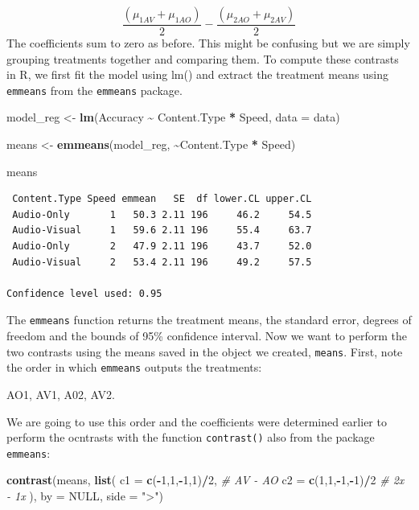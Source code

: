 \documentclass[
  letterpaper,
]{book}
\newenvironment{Shaded}{\begin{snugshade}}{\end{snugshade}}
\newcommand{\AttributeTok}[1]{\textcolor[rgb]{0.13,0.29,0.53}{#1}}
\newcommand{\CommentTok}[1]{\textcolor[rgb]{0.56,0.35,0.01}{\textit{#1}}}
\newcommand{\ConstantTok}[1]{\textcolor[rgb]{0.56,0.35,0.01}{#1}}
\newcommand{\DecValTok}[1]{\textcolor[rgb]{0.00,0.00,0.81}{#1}}
\newcommand{\FunctionTok}[1]{\textcolor[rgb]{0.13,0.29,0.53}{\textbf{#1}}}
\newcommand{\NormalTok}[1]{#1}
\newcommand{\OtherTok}[1]{\textcolor[rgb]{0.56,0.35,0.01}{#1}}
\newcommand{\SpecialCharTok}[1]{\textcolor[rgb]{0.81,0.36,0.00}{\textbf{#1}}}
\newcommand{\StringTok}[1]{\textcolor[rgb]{0.31,0.60,0.02}{#1}}
\begin{document}
\[\frac{(\mu_{1AV} + \mu_{1AO})}{2} - \frac{(\mu_{2AO} + \mu_{2AV})}{2}\]
The coefficients sum to zero as before. This might be confusing but we
are simply grouping treatments together and comparing them. To compute
these contrasts in R, we first fit the model using lm() and extract the
treatment means using \texttt{emmeans} from the \texttt{emmeans}
package.

\begin{Shaded}
\begin{Highlighting}[]
\NormalTok{model\_reg }\OtherTok{\textless{}{-}} \FunctionTok{lm}\NormalTok{(Accuracy }\SpecialCharTok{\textasciitilde{}}\NormalTok{ Content.Type }\SpecialCharTok{*}\NormalTok{ Speed, }\AttributeTok{data =}\NormalTok{ data)}

\NormalTok{means }\OtherTok{\textless{}{-}} \FunctionTok{emmeans}\NormalTok{(model\_reg, }\SpecialCharTok{\textasciitilde{}}\NormalTok{Content.Type }\SpecialCharTok{*}\NormalTok{ Speed)}

\NormalTok{means}
\end{Highlighting}
\end{Shaded}

\begin{verbatim}
 Content.Type Speed emmean   SE  df lower.CL upper.CL
 Audio-Only       1   50.3 2.11 196     46.2     54.5
 Audio-Visual     1   59.6 2.11 196     55.4     63.7
 Audio-Only       2   47.9 2.11 196     43.7     52.0
 Audio-Visual     2   53.4 2.11 196     49.2     57.5

Confidence level used: 0.95 
\end{verbatim}

The \texttt{emmeans} function returns the treatment means, the standard
error, degrees of freedom and the bounds of 95\% confidence interval.
Now we want to perform the two contrasts using the means saved in the
object we created, \texttt{means}. First, note the order in which
\texttt{emmeans} outputs the treatments:

AO1, AV1, A02, AV2.

We are going to use this order and the coefficients were determined
earlier to perform the ocntrasts with the function \texttt{contrast()}
also from the package \texttt{emmeans}:

\begin{Shaded}
\begin{Highlighting}[]
\FunctionTok{contrast}\NormalTok{(means,}
         \FunctionTok{list}\NormalTok{(}
           \AttributeTok{c1 =} \FunctionTok{c}\NormalTok{(}\SpecialCharTok{{-}}\DecValTok{1}\NormalTok{,}\DecValTok{1}\NormalTok{,}\SpecialCharTok{{-}}\DecValTok{1}\NormalTok{,}\DecValTok{1}\NormalTok{)}\SpecialCharTok{/}\DecValTok{2}\NormalTok{, }\CommentTok{\# AV {-} AO}
           \AttributeTok{c2 =} \FunctionTok{c}\NormalTok{(}\DecValTok{1}\NormalTok{,}\DecValTok{1}\NormalTok{,}\SpecialCharTok{{-}}\DecValTok{1}\NormalTok{,}\SpecialCharTok{{-}}\DecValTok{1}\NormalTok{)}\SpecialCharTok{/}\DecValTok{2} \CommentTok{\# 2x {-} 1x}
\NormalTok{         ),}
         \AttributeTok{by =} \ConstantTok{NULL}\NormalTok{, }\AttributeTok{side =} \StringTok{"\textgreater{}"}\NormalTok{)}
\end{Highlighting}
\end{Shaded}
\end{document}

